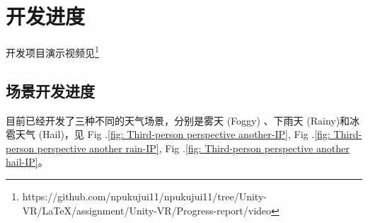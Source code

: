 \documentclass[a4paper,10pt]{article}
\begin{document}
	\section{开发进度}
	
		开发项目演示视频见\footnote{https://github.com/npukujui11/npukujui11/tree/Unity-VR/LaTeX/assignment/Unity-VR/Progress-report/video}
	
		\subsection{场景开发进度}
		
		目前已经开发了三种不同的天气场景，分别是雾天 (Foggy) 、下雨天 (Rainy)和冰雹天气 (Hail)，见 Fig .\ref{fig: Third-person perspective another-IP}, Fig .\ref{fig: Third-person perspective another rain-IP}, Fig .\ref{fig: Third-person perspective another hail-IP}。
		
\end{document}
